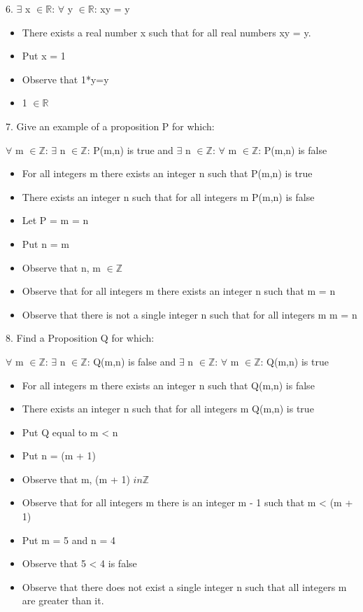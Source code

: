 \documentclass{article}
\begin{document}
  6. \(\exists\) x \(\in \mathbb{R}\): \(\forall\) y \(\in \mathbb{R}\): xy = y
  \begin{itemize}
    \item There exists a real number x such that for all real numbers xy = y.
    \item Put x = 1
    \item Observe that 1*y=y
    \item 1 \(\in \mathbb{R}\)
  \end{itemize}
  7. Give an example of a proposition P for which:
  \begin{center}
  \(\forall\) m \(\in \mathbb{Z}\): \(\exists\) n \(\in \mathbb{Z}\): P(m,n) is true
  and
  \(\exists\) n \(\in \mathbb{Z}\): \(\forall\) m \(\in \mathbb{Z}\): P(m,n) is false
  \end{center}
  \begin{itemize}
    \item For all integers m there exists an integer n such that P(m,n) is true
    \item There exists an integer n such that for all integers m P(m,n) is false
    \item Let P = m = n
    \item Put n = m
    \item Observe that n, m \(\in \mathbb{Z}\)
    \item Observe that for all integers m there exists an integer n such that m = n
    \item Observe that there is not a single integer n such that for all integers m m = n
  \end{itemize}
  8. Find a Proposition Q for which:
  \begin{center}
  \(\forall\) m \(\in \mathbb{Z}\): \(\exists\) n \(\in \mathbb{Z}\): Q(m,n) is false
  and
  \(\exists\) n \(\in \mathbb{Z}\): \(\forall\) m \(\in \mathbb{Z}\): Q(m,n) is true
  \end{center}
  \begin{itemize}
    \item For all integers m there exists an integer n such that Q(m,n) is false
    \item There exists an integer n such that for all integers m Q(m,n) is true
    \item Put Q equal to m < n
    \item Put n = (m + 1)
    \item Observe that m, (m + 1) \(in \mathbb{Z}\)
    \item Observe that for all integers m there is an integer m - 1 such that m < (m + 1)
    \item Put m = 5 and n = 4
    \item Observe that 5 < 4 is false
    \item Observe that there does not exist a single integer n such that all integers m are greater than it.
  \end{itemize}
\end{document}
